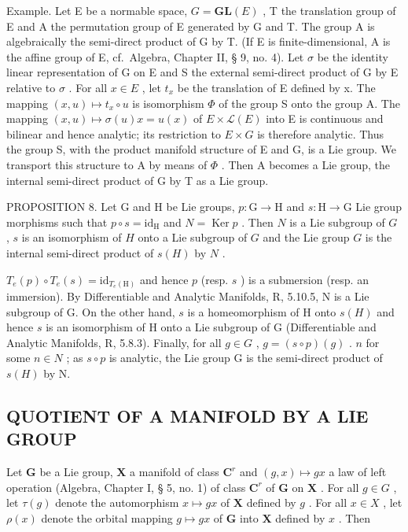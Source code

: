 Example. Let E be a normable space, \(G = \mathbf{GL}(E)\) , T the translation group of E and A the permutation group of E generated by G and T. The group A is algebraically the semi-direct product of G by T. (If E is finite-dimensional, A is the affine group of E, cf.~Algebra, Chapter II, § 9, no. 4). Let \(\sigma\) be the identity linear representation of G on E and S the external semi-direct product of G by E relative to \(\sigma\) . For all \(x \in E\) , let \(t_{x}\) be the translation of E defined by x. The mapping \((x, u) \mapsto t_{x} \circ u\) is isomorphism \(\Phi\) of the group S onto the group A. The mapping \((x, u) \mapsto \sigma(u)x = u(x)\) of \(E \times \mathcal{L}(E)\) into E is continuous and bilinear and hence analytic; its restriction to \(E \times G\) is therefore analytic. Thus the group S, with the product manifold structure of E and G, is a Lie group. We transport this structure to A by means of \(\Phi\) . Then A becomes a Lie group, the internal semi-direct product of G by T as a Lie group.

PROPOSITION 8. Let G and H be Lie groups, \(p: \mathrm{G} \to \mathrm{H}\) and \(s: \mathrm{H} \to \mathrm{G}\) Lie group morphisms such that \(p \circ s = \mathrm{id}_{\mathrm{H}}\) and \(N = \operatorname{Ker} p\) . Then \(N\) is a Lie subgroup of \(G\) , \(s\) is an isomorphism of \(H\) onto a Lie subgroup of \(G\) and the Lie group \(G\) is the internal semi-direct product of \(s(H)\) by \(N\) .

\(T_{e}(p) \circ T_{e}(s) = \mathrm{id}_{T_{e}(\mathrm{H})}\) and hence \(p\) (resp. \(s\) ) is a submersion (resp. an immersion). By Differentiable and Analytic Manifolds, R, 5.10.5, N is a Lie subgroup of G. On the other hand, \(s\) is a homeomorphism of H onto \(s(H)\) and hence \(s\) is an isomorphism of H onto a Lie subgroup of G (Differentiable and Analytic Manifolds, R, 5.8.3). Finally, for all \(g \in G\) , \(g = (s \circ p)(g)\) . \(n\) for some \(n \in N\) ; as \(s \circ p\) is analytic, the Lie group G is the semi-direct product of \(s(H)\) by N.

\subsection{QUOTIENT OF A MANIFOLD BY A LIE GROUP}

Let \(\mathbf{G}\) be a Lie group, \(\mathbf{X}\) a manifold of class \(\mathbf{C}^r\) and \((g,x)\mapsto gx\) a law of left operation (Algebra, Chapter I, § 5, no. 1) of class \(\mathbf{C}^r\) of \(\mathbf{G}\) on \(\mathbf{X}\) . For all \(g\in G\) , let \(\tau (g)\) denote the automorphism \(x\mapsto gx\) of \(\mathbf{X}\) defined by \(g\) . For all \(x\in X\) , let \(\rho (x)\) denote the orbital mapping \(g\mapsto gx\) of \(\mathbf{G}\) into \(\mathbf{X}\) defined by \(x\) . Then

